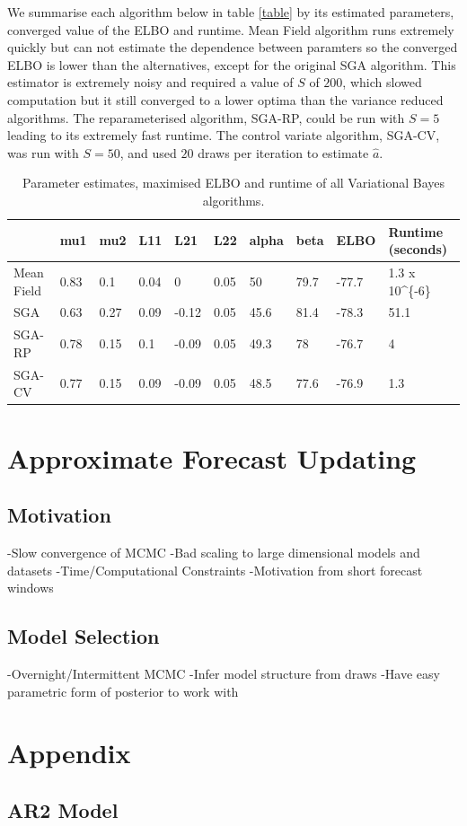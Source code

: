 \documentclass{article}\usepackage[]{graphicx}\usepackage[]{color}
\newenvironment{knitrout}{}{} %
\numberwithin{equation}{section}
\begin{document}
We summarise each algorithm below in table \ref{table} by its estimated parameters, converged value of the ELBO and runtime. Mean Field algorithm runs extremely quickly but can not estimate the dependence between paramters so the converged ELBO is lower than the alternatives, except for the original SGA algorithm. This estimator is extremely noisy and required a value of $S$ of $200$, which slowed computation but it still converged to a lower optima than the variance reduced algorithms. The reparameterised algorithm, SGA-RP, could be run with $S = 5$ leading to its extremely fast runtime. The control variate algorithm, SGA-CV, was run with $S = 50$, and used $20$ draws per iteration to estimate $\hat{a}$.

\begin{table}
\centering
\label{AR2results}
\begin{knitrout}
\color{fgcolor}
\begin{tabular}{l|l|l|l|l|l|l|l|l|l}
\hline
  & mu1 & mu2 & L11 & L21 & L22 & alpha & beta & ELBO & Runtime (seconds)\\
\hline
Mean Field & 0.83 & 0.1 & 0.04 & 0 & 0.05 & 50 & 79.7 & -77.7 & 1.3 x 10\textasciicircum{}\{-6\}\\
\hline
SGA & 0.63 & 0.27 & 0.09 & -0.12 & 0.05 & 45.6 & 81.4 & -78.3 & 51.1\\
\hline
SGA-RP & 0.78 & 0.15 & 0.1 & -0.09 & 0.05 & 49.3 & 78 & -76.7 & 4\\
\hline
SGA-CV & 0.77 & 0.15 & 0.09 & -0.09 & 0.05 & 48.5 & 77.6 & -76.9 & 1.3\\
\hline
\end{tabular}


\end{knitrout}
\caption{Parameter estimates, maximised ELBO and runtime of all Variational Bayes algorithms.}
\end{table}

\section{Approximate Forecast Updating}
\subsection{Motivation}
-Slow convergence of MCMC
-Bad scaling to large dimensional models and datasets
-Time/Computational Constraints
-Motivation from short forecast windows
\subsection{Model Selection}
-Overnight/Intermittent MCMC
-Infer model structure from draws
-Have easy parametric form of posterior to work with






\section{Appendix}
\subsection{AR2 Model}
\end{document}
